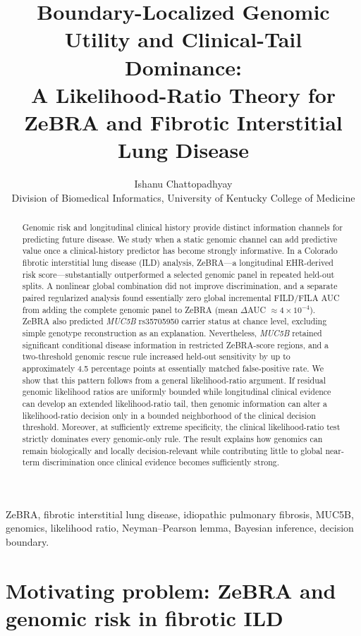 \documentclass[journal]{IEEEtran}
\title{Boundary-Localized Genomic Utility and Clinical-Tail Dominance:\\
A Likelihood-Ratio Theory for ZeBRA and Fibrotic Interstitial Lung Disease}
\author{Ishanu Chattopadhyay\\
Division of Biomedical Informatics, University of Kentucky College of Medicine}
\begin{document}
\maketitle

\begin{abstract}
Genomic risk and longitudinal clinical history provide distinct information channels for predicting future disease. We study when a static genomic channel can add predictive value once a clinical-history predictor has become strongly informative. In a Colorado fibrotic interstitial lung disease (ILD) analysis, ZeBRA---a longitudinal EHR-derived risk score---substantially outperformed a selected genomic panel in repeated held-out splits. A nonlinear global combination did not improve discrimination, and a separate paired regularized analysis found essentially zero global incremental FILD/FILA AUC from adding the complete genomic panel to ZeBRA (mean $\Delta$AUC $\approx4\times10^{-4}$). ZeBRA also predicted \textit{MUC5B} rs35705950 carrier status at chance level, excluding simple genotype reconstruction as an explanation. Nevertheless, \textit{MUC5B} retained significant conditional disease information in restricted ZeBRA-score regions, and a two-threshold genomic rescue rule increased held-out sensitivity by up to approximately 4.5 percentage points at essentially matched false-positive rate. We show that this pattern follows from a general likelihood-ratio argument. If residual genomic likelihood ratios are uniformly bounded while longitudinal clinical evidence can develop an extended likelihood-ratio tail, then genomic information can alter a likelihood-ratio decision only in a bounded neighborhood of the clinical decision threshold. Moreover, at sufficiently extreme specificity, the clinical likelihood-ratio test strictly dominates every genomic-only rule. The result explains how genomics can remain biologically and locally decision-relevant while contributing little to global near-term discrimination once clinical evidence becomes sufficiently strong.
\end{abstract}

\begin{IEEEkeywords}
ZeBRA, fibrotic interstitial lung disease, idiopathic pulmonary fibrosis, MUC5B, genomics, likelihood ratio, Neyman--Pearson lemma, Bayesian inference, decision boundary.
\end{IEEEkeywords}

\section{Motivating problem: ZeBRA and genomic risk in fibrotic ILD}
\end{document}
